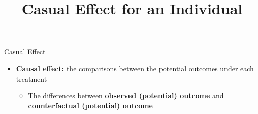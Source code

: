 \documentclass[hyperref={pdfpagelabels=false}]{beamer}
\begin{document}





\date
{}


\begin{frame}{}
	\titlepage
\end{frame}







\begin{frame}{Casual Effect}
\begin{itemize} 
\item \textbf{Causal effect:} the comparisons between the
potential outcomes under each treatment
\vspace{0.2cm}  
\begin{itemize} 
\item The differences between \textbf{observed (potential) outcome} and \textbf{counterfactual (potential) outcome} 
\vspace{0.2cm}  
\end{itemize}



\end{itemize}
\end{frame}





\title[]  
{Casual Effect for an Individual}


\author 
{}

\institute{}






\date
{}


\begin{frame}{}
	\titlepage
\end{frame}
\end{document}
